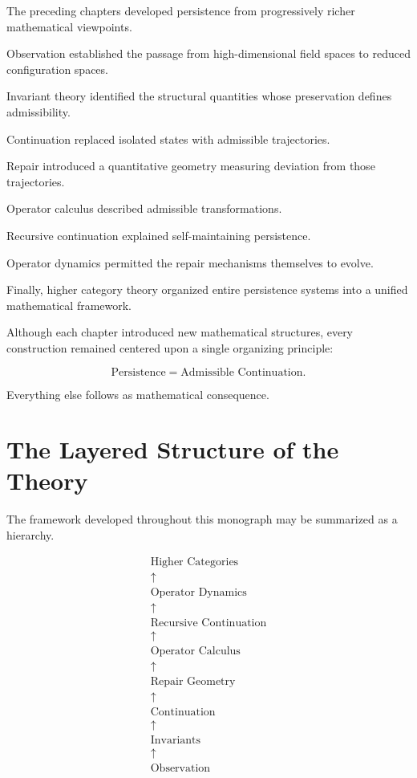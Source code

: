 \documentclass[11pt]{book}
\numberwithin{equation}{chapter}
\theoremstyle{definition}
\theoremstyle{plain}
\begin{document}
The preceding chapters developed persistence from progressively richer
mathematical viewpoints.

Observation established the passage from high-dimensional field spaces
to reduced configuration spaces.

Invariant theory identified the structural quantities whose
preservation defines admissibility.

Continuation replaced isolated states with admissible trajectories.

Repair introduced a quantitative geometry measuring deviation from
those trajectories.

Operator calculus described admissible transformations.

Recursive continuation explained self-maintaining persistence.

Operator dynamics permitted the repair mechanisms themselves to evolve.

Finally, higher category theory organized entire persistence systems
into a unified mathematical framework.

Although each chapter introduced new mathematical structures, every
construction remained centered upon a single organizing principle:

\[
\text{Persistence}
=
\text{Admissible Continuation}.
\]

Everything else follows as mathematical consequence.

\section{The Layered Structure of the Theory}

The framework developed throughout this monograph may be summarized as
a hierarchy.

\[
\begin{array}{c}
\text{Higher Categories}
\\
\uparrow
\\
\text{Operator Dynamics}
\\
\uparrow
\\
\text{Recursive Continuation}
\\
\uparrow
\\
\text{Operator Calculus}
\\
\uparrow
\\
\text{Repair Geometry}
\\
\uparrow
\\
\text{Continuation}
\\
\uparrow
\\
\text{Invariants}
\\
\uparrow
\\
\text{Observation}
\end{array}
\]
\end{document}
